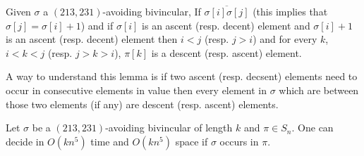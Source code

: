 \documentclass[a4paper]{llncs}
\newcommand{\pmotif}{\sigma}
\begin{document}
\begin{lemma}
\label{lemma:ascentDescentAscent}
Given $\pmotif$ a $(213,231)$-avoiding bivincular,
If $\overline{\sigma[i]\sigma[j]}$ (this implies that $\sigma[j]=\sigma[i]+1$) and 
if $\sigma[i]$ is an ascent (resp. decent) element and $\sigma[i]+1$ is an ascent 
(resp. decent) element then 
$i<j$ (resp. $j>i$) and for every $k$, $i<k<j$ (resp. $j>k>i$), $\pi[k]$ is a descent 
(resp. ascent) element.    
\end{lemma}

A way to understand this lemma is if two ascent (resp. decsent) elements
need to occur in consecutive elements in value then every element in $\pmotif$ which are between those two elements (if any) are descent (resp. ascent) elements. 


\begin{proposition}
\label{Proposition:bivincular pattern}
Let $\sigma$ be a $(213,231)$-avoiding bivincular of length $k$
and $\pi \in S_n$.
One can decide in $O(kn^5)$ time
and $O(kn^5)$ space if $\sigma$ occurs in $\pi$.
\end{proposition}
\end{document}
